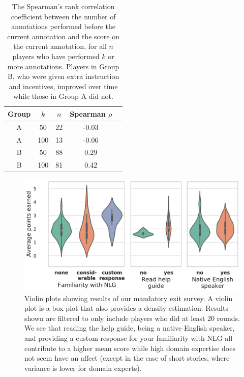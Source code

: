 \begin{table}[tb]
\small
\centering
\begin{tabular}{SSSSS} \toprule
    {Group} & {$k$} & {$n$} & {Spearman $\rho$}\\ \midrule
    {A} & {50} & {22} & {-0.03} \\
    {A} & {100} & {13} & {-0.06}  \\
    \midrule
    {B} & {50} & {88} & {0.29} \\
    {B} & {100} & {81} & {0.42} \\
    \bottomrule
\end{tabular}
\caption{The Spearman's rank correlation coefficient between the number of annotations performed before the current annotation and the score on the current annotation, for all $n$ players who have performed $k$ or more annotations. Players in Group B, who were given extra instruction and incentives, improved over time while those in Group A did not.}
\label{tab:correlation_over_time}
\end{table}

\begin{figure}[tb]
    \centering
    \includegraphics[width=\linewidth]{figures/survey_results_no_fam.pdf}
    \caption{Violin plots showing results of our mandatory exit survey. A violin plot is a box plot that also provides a density estimation. Results shown are filtered to only include players who did at least 20 rounds. We see that reading the help guide, being a native English speaker, and providing a custom response for your familiarity with NLG all contribute to a higher mean score while high domain expertise does not seem have an affect (except in the case of short stories, where variance is lower for domain experts).}
    \label{fig:survey_results}
\end{figure}

